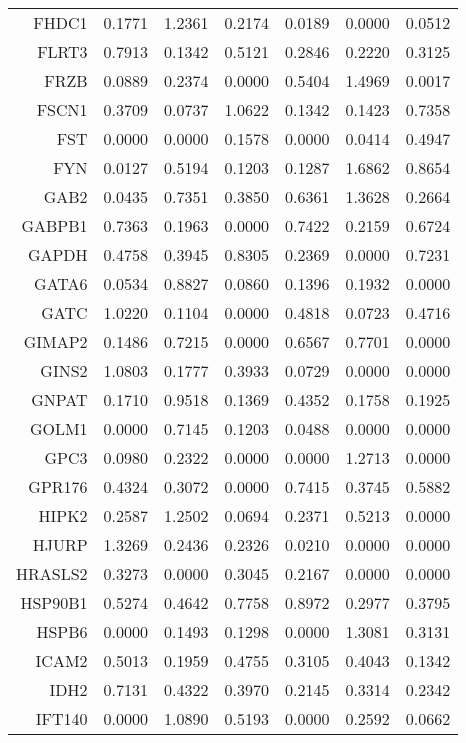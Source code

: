 \begin{longtable}{rrrrrrr}
  FHDC1 & 0.1771 & 1.2361 & 0.2174 & 0.0189 & 0.0000 & 0.0512 \\ 
  FLRT3 & 0.7913 & 0.1342 & 0.5121 & 0.2846 & 0.2220 & 0.3125 \\ 
  FRZB & 0.0889 & 0.2374 & 0.0000 & 0.5404 & 1.4969 & 0.0017 \\ 
  FSCN1 & 0.3709 & 0.0737 & 1.0622 & 0.1342 & 0.1423 & 0.7358 \\ 
  FST & 0.0000 & 0.0000 & 0.1578 & 0.0000 & 0.0414 & 0.4947 \\ 
  FYN & 0.0127 & 0.5194 & 0.1203 & 0.1287 & 1.6862 & 0.8654 \\ 
  GAB2 & 0.0435 & 0.7351 & 0.3850 & 0.6361 & 1.3628 & 0.2664 \\ 
  GABPB1 & 0.7363 & 0.1963 & 0.0000 & 0.7422 & 0.2159 & 0.6724 \\ 
  GAPDH & 0.4758 & 0.3945 & 0.8305 & 0.2369 & 0.0000 & 0.7231 \\ 
  GATA6 & 0.0534 & 0.8827 & 0.0860 & 0.1396 & 0.1932 & 0.0000 \\ 
  GATC & 1.0220 & 0.1104 & 0.0000 & 0.4818 & 0.0723 & 0.4716 \\ 
  GIMAP2 & 0.1486 & 0.7215 & 0.0000 & 0.6567 & 0.7701 & 0.0000 \\ 
  GINS2 & 1.0803 & 0.1777 & 0.3933 & 0.0729 & 0.0000 & 0.0000 \\ 
  GNPAT & 0.1710 & 0.9518 & 0.1369 & 0.4352 & 0.1758 & 0.1925 \\ 
  GOLM1 & 0.0000 & 0.7145 & 0.1203 & 0.0488 & 0.0000 & 0.0000 \\ 
  GPC3 & 0.0980 & 0.2322 & 0.0000 & 0.0000 & 1.2713 & 0.0000 \\ 
  GPR176 & 0.4324 & 0.3072 & 0.0000 & 0.7415 & 0.3745 & 0.5882 \\ 
  HIPK2 & 0.2587 & 1.2502 & 0.0694 & 0.2371 & 0.5213 & 0.0000 \\ 
  HJURP & 1.3269 & 0.2436 & 0.2326 & 0.0210 & 0.0000 & 0.0000 \\ 
  HRASLS2 & 0.3273 & 0.0000 & 0.3045 & 0.2167 & 0.0000 & 0.0000 \\ 
  HSP90B1 & 0.5274 & 0.4642 & 0.7758 & 0.8972 & 0.2977 & 0.3795 \\ 
  HSPB6 & 0.0000 & 0.1493 & 0.1298 & 0.0000 & 1.3081 & 0.3131 \\ 
  ICAM2 & 0.5013 & 0.1959 & 0.4755 & 0.3105 & 0.4043 & 0.1342 \\ 
  IDH2 & 0.7131 & 0.4322 & 0.3970 & 0.2145 & 0.3314 & 0.2342 \\ 
  IFT140 & 0.0000 & 1.0890 & 0.5193 & 0.0000 & 0.2592 & 0.0662 \\ 

\end{longtable}
